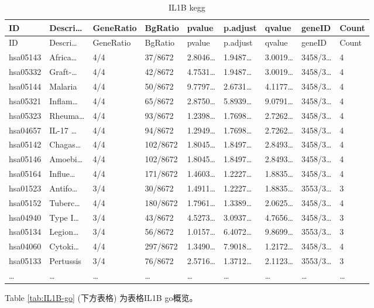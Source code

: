 \documentclass[
]{article}
\begin{document}
\begin{longtable}[]{@{}lllllllll@{}}
\caption{\label{tab:IL1B-kegg}IL1B kegg}\tabularnewline
\toprule
ID & Descri\ldots{} & GeneRatio & BgRatio & pvalue & p.adjust & qvalue & geneID & Count\tabularnewline
\midrule
\endfirsthead
\toprule
ID & Descri\ldots{} & GeneRatio & BgRatio & pvalue & p.adjust & qvalue & geneID & Count\tabularnewline
\midrule
\endhead
hsa05143 & Africa\ldots{} & 4/4 & 37/8672 & 2.8046\ldots{} & 1.9487\ldots{} & 3.0019\ldots{} & 3458/3\ldots{} & 4\tabularnewline
hsa05332 & Graft-\ldots{} & 4/4 & 42/8672 & 4.7531\ldots{} & 1.9487\ldots{} & 3.0019\ldots{} & 3458/3\ldots{} & 4\tabularnewline
hsa05144 & Malaria & 4/4 & 50/8672 & 9.7797\ldots{} & 2.6731\ldots{} & 4.1177\ldots{} & 3458/3\ldots{} & 4\tabularnewline
hsa05321 & Inflam\ldots{} & 4/4 & 65/8672 & 2.8750\ldots{} & 5.8939\ldots{} & 9.0791\ldots{} & 3458/3\ldots{} & 4\tabularnewline
hsa05323 & Rheuma\ldots{} & 4/4 & 93/8672 & 1.2398\ldots{} & 1.7698\ldots{} & 2.7262\ldots{} & 3458/3\ldots{} & 4\tabularnewline
hsa04657 & IL-17 \ldots{} & 4/4 & 94/8672 & 1.2949\ldots{} & 1.7698\ldots{} & 2.7262\ldots{} & 3458/3\ldots{} & 4\tabularnewline
hsa05142 & Chagas\ldots{} & 4/4 & 102/8672 & 1.8045\ldots{} & 1.8497\ldots{} & 2.8493\ldots{} & 3458/3\ldots{} & 4\tabularnewline
hsa05146 & Amoebi\ldots{} & 4/4 & 102/8672 & 1.8045\ldots{} & 1.8497\ldots{} & 2.8493\ldots{} & 3458/3\ldots{} & 4\tabularnewline
hsa05164 & Influe\ldots{} & 4/4 & 171/8672 & 1.4603\ldots{} & 1.2227\ldots{} & 1.8835\ldots{} & 3458/3\ldots{} & 4\tabularnewline
hsa01523 & Antifo\ldots{} & 3/4 & 30/8672 & 1.4911\ldots{} & 1.2227\ldots{} & 1.8835\ldots{} & 3553/3\ldots{} & 3\tabularnewline
hsa05152 & Tuberc\ldots{} & 4/4 & 180/8672 & 1.7961\ldots{} & 1.3389\ldots{} & 2.0625\ldots{} & 3458/3\ldots{} & 4\tabularnewline
hsa04940 & Type I\ldots{} & 3/4 & 43/8672 & 4.5273\ldots{} & 3.0937\ldots{} & 4.7656\ldots{} & 3458/3\ldots{} & 3\tabularnewline
hsa05134 & Legion\ldots{} & 3/4 & 56/8672 & 1.0157\ldots{} & 6.4072\ldots{} & 9.8699\ldots{} & 3553/3\ldots{} & 3\tabularnewline
hsa04060 & Cytoki\ldots{} & 4/4 & 297/8672 & 1.3490\ldots{} & 7.9018\ldots{} & 1.2172\ldots{} & 3458/3\ldots{} & 4\tabularnewline
hsa05133 & Pertussis & 3/4 & 76/8672 & 2.5716\ldots{} & 1.3712\ldots{} & 2.1123\ldots{} & 3553/3\ldots{} & 3\tabularnewline
\ldots{} & \ldots{} & \ldots{} & \ldots{} & \ldots{} & \ldots{} & \ldots{} & \ldots{} & \ldots{}\tabularnewline
\bottomrule
\end{longtable}

Table \ref{tab:IL1B-go} (下方表格) 为表格IL1B go概览。
\end{document}
